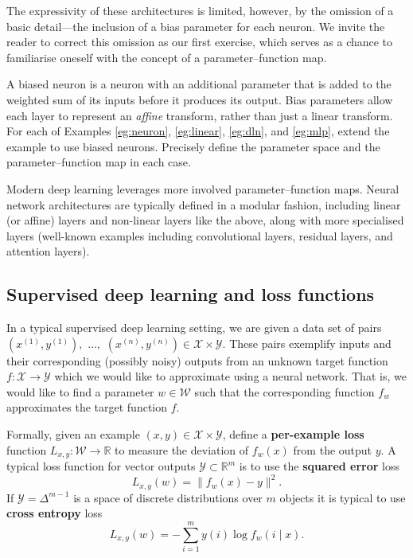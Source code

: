 \documentclass[11pt]{article}
\newcommand{\R}{\mathbb{R}}
\newcommand{\X}{\mathcal{X}}
\newcommand{\Y}{\mathcal{Y}}
\newcommand{\W}{\mathcal{W}}
\begin{document}
The expressivity of these architectures is limited, however, by the omission of
a basic detail---the inclusion of a bias parameter for each neuron. We invite
the reader to correct this omission as our first exercise, which serves as a
chance to familiarise oneself with the concept of a parameter--function map.

\begin{exercise}
\label{ex:biased-neurons}
    A biased neuron is a neuron with an additional parameter that is added to
    the weighted sum of its inputs before it produces its output. Bias
    parameters allow each layer to represent an \emph{affine} transform, rather
    than just a linear transform. For each of Examples \ref{eg:neuron},
    \ref{eg:linear}, \ref{eg:dln}, and \ref{eg:mlp}, extend the example to use
    biased neurons. Precisely define the parameter space and the
    parameter--function map in each case.
\end{exercise}

Modern deep learning leverages more involved parameter--function maps. Neural
network architectures are typically defined in a modular fashion, including
linear (or affine) layers and non-linear layers like the above, along with more
specialised layers (well-known examples including convolutional layers,
residual layers, and attention layers).

\subsection{Supervised deep learning and loss functions}

In a typical supervised deep learning setting, we are given a data set of pairs
    $(x^{(1)}, y^{(1)}),$ $\ldots,$ $(x^{(n)}, y^{(n)}) \in \X \times \Y$.
These pairs exemplify inputs and their corresponding (possibly noisy) outputs
from an unknown target function
    $f : \X \to \Y$
which we would like to approximate using a neural network. That is, we would
like to find a parameter $w \in \W$ such that the corresponding function $f_w$
approximates the target function $f$.

Formally, given an example $(x, y) \in \X \times \Y$, define a
\textbf{per-example loss} function
    $L_{x,y} : \W \to \R$
to measure the deviation of $f_w(x)$ from the output $y$. A typical loss
function for vector outputs $\Y \subset \R^m$ is to use the \textbf{squared
error} loss
\begin{equation}
    \label{eq:square-loss}
    L_{x,y}(w) = \|f_w(x) - y\|^2.
\end{equation}
If $\Y = \Delta^{m-1}$ is a space of discrete distributions over $m$ objects it
is typical to use \textbf{cross entropy} loss
\begin{equation}
    \label{eq:cross-entropy}
    L_{x,y}(w) = - \sum_{i=1}^m y(i) \log f_w(i \mid x).
\end{equation}
\end{document}
